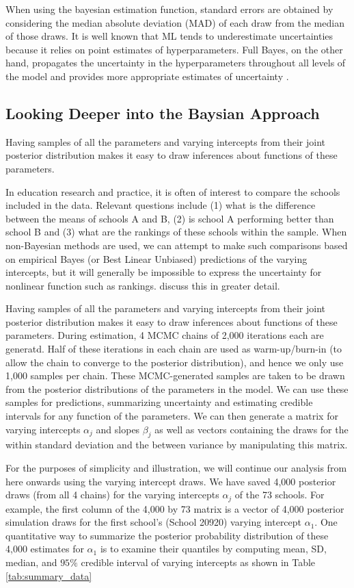 When using the bayesian estimation function, standard errors are obtained by considering the median absolute deviation (MAD) of each draw from the median of those draws.  It is well known that ML tends to underestimate uncertainties because it relies on point estimates of hyperparameters. Full Bayes, on the other hand, propagates the uncertainty in the hyperparameters throughout all levels of the model and provides more appropriate estimates of uncertainty \cite{browne2006comparison}.

\subsection{Looking Deeper into the Baysian Approach}
\label{section:Deeper}
Having samples of all the parameters and varying intercepts from their joint posterior distribution makes it easy to draw inferences about functions of these parameters.

In education research and practice, it is often of interest to compare the schools included in the data. Relevant questions include (1) what is the difference between the means of schools A and B, (2) is school A performing better than school B and (3) what are the rankings of these schools within the sample. When non-Bayesian methods are used, we can attempt to make such comparisons based on empirical Bayes (or Best Linear Unbiased) predictions of the varying intercepts, but it will generally be impossible to express the uncertainty for nonlinear function such as rankings. \cite{goldstein1996league} discuss this in greater detail.

Having samples of all the parameters and varying intercepts from their joint posterior distribution makes it easy to draw inferences about functions of these parameters.
During estimation, 4 MCMC chains of 2,000 iterations each are generatd. Half of these iterations in each chain are used as warm-up/burn-in (to allow the chain to converge to the posterior distribution), and hence we only use 1,000 samples per chain. These MCMC-generated samples are taken to be drawn from the posterior distributions of the parameters in the model. We can use these samples for predictions, summarizing uncertainty and estimating credible intervals for any function of the parameters.
We can then generate a matrix for varying intercepts $\alpha_j$ and slopes $\beta_j$ as well as vectors containing the draws for the within standard deviation and the between variance by manipulating this matrix.

For the purposes of simplicity and illustration, we will continue our analysis from here onwards using the varying intercept draws. We have saved 4,000 posterior draws (from all 4 chains) for the varying intercepts $\alpha_{j}$ of the 73 schools. For example, the first column of the 4,000 by 73 matrix is a vector of 4,000 posterior simulation draws for the first school's (School 20920) varying intercept $\alpha_{1}$.  One quantitative way to summarize the posterior probability distribution of these 4,000 estimates for $\alpha_{1}$ is to examine their quantiles by computing mean, SD, median, and $95\%$ credible interval of varying intercepts as shown in Table \ref{tab:summary_data}

